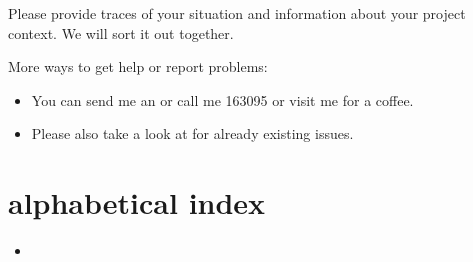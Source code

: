 \documentclass[letterpaper,10pt,english]{sphinxmanual}
\begin{document}
Please provide traces of your situation and information about your project context. We will sort it out together.

More  ways to get help or report problems:
\begin{itemize}
\item {} 
You can send me an  or call me 163095 or visit me for a coffee.

\item {} 
Please also take a look at  for already existing issues.

\end{itemize}


\chapter{alphabetical index}
\label{\detokenize{index:alphabetical-index}}\begin{itemize}
\item {} 

\end{itemize}



\renewcommand{\indexname}{Index}
\printindex
\end{document}
